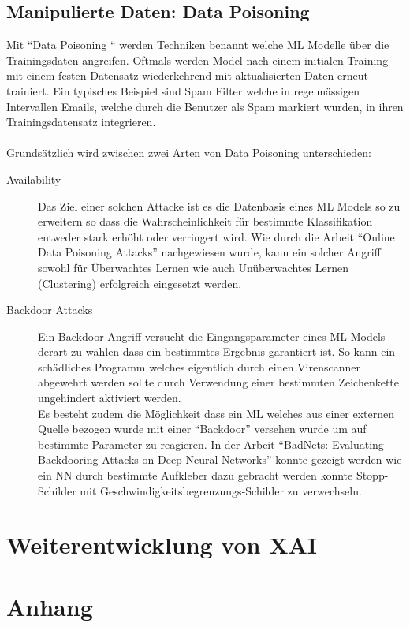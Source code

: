 \documentclass[
  12pt, %
  a4paper, %
  oneside, %
  openany, 
  numbers=noenddot, %
  BCOR=5mm, %
  parskip=half*, %
  thesis, %
]{bfhbook}
\begin{document}
\section{Manipulierte Daten: Data Poisoning}
Mit ``Data Poisoning `` werden Techniken benannt welche \Gls{ML} Modelle über die Trainingsdaten angreifen. Oftmals werden Model nach einem initialen Training mit einem festen Datensatz wiederkehrend mit aktualisierten Daten erneut trainiert. Ein typisches Beispiel sind Spam Filter welche in regelmässigen Intervallen Emails, welche durch die Benutzer als Spam markiert wurden, in ihren Trainingsdatensatz integrieren.
 \\\\
Grundsätzlich wird zwischen zwei Arten von Data Poisoning unterschieden:
\begin{description}
  		\item[Availability] Das Ziel einer solchen Attacke ist es die Datenbasis eines \Gls{ML} Models so zu erweitern so dass die Wahrscheinlichkeit für bestimmte Klassifikation entweder stark erhöht oder verringert wird. Wie durch die Arbeit ``Online Data Poisoning Attacks'' \parencite{Zhang2019} nachgewiesen wurde, kann ein solcher Angriff sowohl für Überwachtes Lernen wie auch Unüberwachtes Lernen (Clustering) erfolgreich eingesetzt werden. 
  		\item[Backdoor Attacks] Ein Backdoor Angriff versucht die Eingangsparameter eines \Gls{ML} Models derart zu wählen dass ein bestimmtes Ergebnis garantiert ist. So kann ein schädliches Programm welches eigentlich durch einen Virenscanner abgewehrt werden sollte durch Verwendung einer bestimmten Zeichenkette ungehindert aktiviert werden.\\
  		Es besteht zudem die Möglichkeit dass ein \Gls{ML} welches aus einer externen Quelle bezogen wurde mit einer ``Backdoor'' versehen wurde um auf bestimmte Parameter zu reagieren. In der Arbeit ``BadNets: Evaluating Backdooring Attacks
on Deep Neural Networks'' \parencite{Gu2019} konnte gezeigt werden wie ein \Gls{NN} durch bestimmte Aufkleber dazu gebracht werden konnte Stopp-Schilder mit Geschwindigkeitsbegrenzungs-Schilder zu verwechseln.
	\end{description}

\chapter{Weiterentwicklung von XAI}

\chapter{Anhang}
\end{document}
